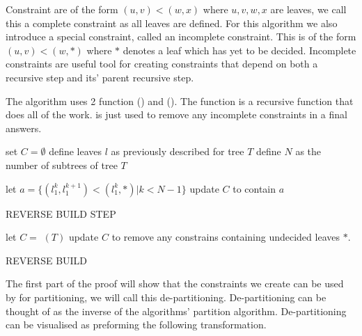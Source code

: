 Constraint are of the form $(u,v)<(w,x)$ where $u,v,w,x$ are leaves, we call this a complete constraint as all leaves are defined.
For this algorithm we also introduce a special constraint, called an incomplete constraint.
This is of the form $(u, v)<(w, *)$ where $*$ denotes a leaf which has yet to be decided.
Incomplete constraints are useful tool for creating constraints that depend on both a recursive step and its' parent recursive step.  


The  algorithm uses 2 function  () and  (). The  function is a recursive function that does all of the work.  is just used to remove any incomplete constraints in a final answers.

\begin{algorithm}[H]
    \LinesNumbered
    \SetAlgoLined
     set $C=\emptyset$\;
     define leaves $l$ as previously described for tree $T$\;
     define $N$ as the number of subtrees of tree $T$\;
     
     let $a = \{(l_1^k, l_1^{k+1}) < (l_1^k, *)|k<N-1\}$\label{alg:make}\;
     update $C$ to contain $a$\;
    
     \caption{REVERSE BUILD STEP}
\end{algorithm}

\begin{algorithm}[H]
    \SetAlgoLined
     
    let $C=$ $(T)$\;
    update $C$ to remove any constrains containing undecided leaves $*$.
     
     \caption{REVERSE BUILD}
\end{algorithm}



 The first part of the proof will show that the constraints we create can be used by  for partitioning, we will call this de-partitioning.
 De-partitioning can be thought of as the inverse of the  algorithms' partition algorithm. De-partitioning can be visualised as preforming the following transformation.\\
 
